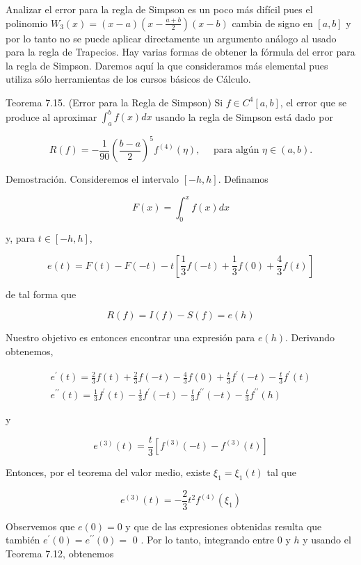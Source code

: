 \documentclass[10pt]{article}
\begin{document}
Analizar el error para la regla de Simpson es un poco más difícil pues el polinomio $W_{3}(x)= (x-a)\left(x-\frac{a+b}{2}\right)(x-b)$ cambia de signo en $[a, b]$ y por lo tanto no se puede aplicar directamente un argumento análogo al usado para la regla de Trapecios. Hay varias formas de obtener la fórmula del error para la regla de Simpson. Daremos aquí la que consideramos más elemental pues utiliza sólo herramientas de los cursos básicos de Cálculo.

Teorema 7.15. (Error para la Regla de Simpson) Si $f \in C^{4}[a, b]$, el error que se produce al aproximar $\int_{a}^{b} f(x) d x$ usando la regla de Simpson está dado por


\begin{equation*}
R(f)=-\frac{1}{90}\left(\frac{b-a}{2}\right)^{5} f^{(4)}(\eta), \quad \text { para algún } \eta \in(a, b) . \tag{7.8}
\end{equation*}


Demostración. Consideremos el intervalo $[-h, h]$. Definamos

$$
F(x)=\int_{0}^{x} f(x) d x
$$

y, para $t \in[-h, h]$,

$$
e(t)=F(t)-F(-t)-t\left[\frac{1}{3} f(-t)+\frac{1}{3} f(0)+\frac{4}{3} f(t)\right]
$$

de tal forma que

$$
R(f)=I(f)-S(f)=e(h)
$$

Nuestro objetivo es entonces encontrar una expresión para $e(h)$. Derivando obtenemos,

$$
\begin{gathered}
e^{\prime}(t)=\frac{2}{3} f(t)+\frac{2}{3} f(-t)-\frac{4}{3} f(0)+\frac{t}{3} f^{\prime}(-t)-\frac{t}{3} f^{\prime}(t) \\
e^{\prime \prime}(t)=\frac{1}{3} f^{\prime}(t)-\frac{1}{3} f^{\prime}(-t)-\frac{t}{3} f^{\prime \prime}(-t)-\frac{t}{3} f^{\prime \prime}(h)
\end{gathered}
$$

y

$$
e^{(3)}(t)=\frac{t}{3}\left[f^{(3)}(-t)-f^{(3)}(t)\right]
$$

Entonces, por el teorema del valor medio, existe $\xi_{1}=\xi_{1}(t)$ tal que

$$
e^{(3)}(t)=-\frac{2}{3} t^{2} f^{(4)}\left(\xi_{1}\right)
$$

Observemos que $e(0)=0$ y que de las expresiones obtenidas resulta que también $e^{\prime}(0)=e^{\prime \prime}(0)=$ 0 . Por lo tanto, integrando entre 0 y $h$ y usando el Teorema 7.12, obtenemos
\end{document}
